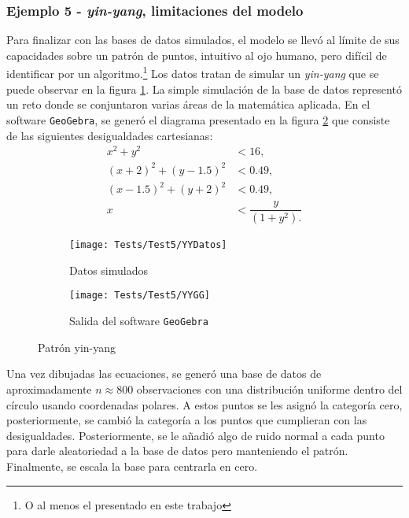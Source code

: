 \documentclass[../Main/Main.tex]{subfiles}
\begin{document}
\subsubsection*{Ejemplo 5 - \textit{yin-yang}, limitaciones del modelo}
Para finalizar con las bases de datos simulados, el modelo se llevó al límite de sus capacidades sobre un patrón de puntos, intuitivo al ojo humano, pero difícil de identificar por un algoritmo.\footnote{O al menos el presentado en este trabajo} Los datos tratan de simular un \textit{yin-yang} que se puede observar en la figura \ref{fig:YYDatos}. La simple simulación de la base de datos representó un reto donde se conjuntaron varias áreas de la matemática aplicada. En el software \verb|GeoGebra|, se generó el diagrama presentado en la figura \ref{fig:YYGG} que consiste de las siguientes desigualdades cartesianas:
\begin{align*}
	x^2 + y^2 &< 16, \\
	(x+2)^2 + (y-1.5)^2 &< 0.49, \\
	(x-1.5)^2 + (y+2)^2 &< 0.49, \\[4pt]
	x &< \dfrac{y}{(1+y^2).}
\end{align*}

\begin{figure}[h]
        \centering
        \begin{subfigure}[t]{0.45\textwidth}
            \centering
            \texttt{[image: Tests/Test5/YYDatos]}
            \caption{Datos simulados}   
            \label{fig:YYDatos}
        \end{subfigure}
        \hfill
        \begin{subfigure}[t]{0.45\textwidth}  
            \centering 
            \texttt{[image: Tests/Test5/YYGG]}
            \caption{Salida del software \texttt{GeoGebra}}
            \label{fig:YYGG}
        \end{subfigure}
        \caption{Patrón yin-yang}
        \label{fig:YYInitialPlots}
\end{figure}
Una vez dibujadas las ecuaciones, se generó una base de datos de aproximadamente $n \approx \num{800}$ observaciones con una distribución uniforme dentro del círculo usando coordenadas polares. A estos puntos se les asignó la categoría cero, posteriormente, se cambió la categoría a los puntos que cumplieran con las desigualdades. Posteriormente, se le añadió algo de ruido normal a cada punto para darle aleatoriedad a la base de datos pero manteniendo el patrón. Finalmente, se escala la base para centrarla en cero.  
\end{document}
